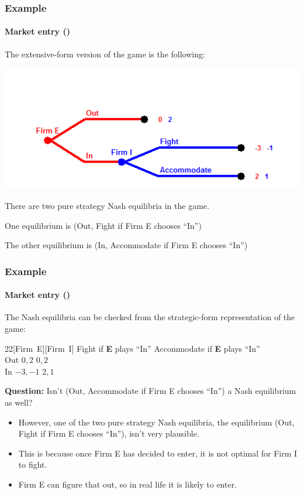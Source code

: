 \documentclass[10pt]{beamer}
\theoremstyle{definition}
\begin{document}
\begin{frame}[fragile]
\frametitle{Example }
\framesubtitle{Market entry ()}
The extensive-form version of the game is the following:
\begin{center}
\includegraphics[width=0.8\linewidth]{Predation_game}
\end{center}
\begin{itemize}{\small
\item There are two pure strategy Nash equilibria in the game.
\item One equilibrium is (Out, Fight if Firm E chooses ``In'')
\item The other equilibrium is (In, Accommodate if Firm E chooses ``In'')}
\end{itemize}
\end{frame}



\begin{frame}[fragile]
\frametitle{Example }
\framesubtitle{Market entry ()}
The Nash equilibria can be checked from the strategic-form representation of the game:
\begin{center}
\begin{game}{2}{2}[Firm~E][Firm~I]
 \> Fight if \textbf{E} plays ``In'' \> Accommodate if \textbf{E} plays ``In'' \\
Out \> $ 0,2 $ \> $ 0,2 $ \\
In \> $ -3,-1 $ \> $ 2,1 $
\end{game}
\end{center}\bigskip
{\small
\textbf{Question:} Isn't (Out, Accommodate if Firm E chooses ``In'') a Nash equilibrium as well? \bigskip \pause 

\begin{itemize}
\item However, one of the two pure strategy Nash equilibria, the equilibrium (Out, Fight if Firm E chooses ``In''), isn't very plausible.
\item This is because once Firm E has decided to enter, it is not optimal for Firm I to fight.
\item Firm E can figure that out, so in real life it is likely to enter.
\end{itemize}}
\end{frame}
\end{document}
